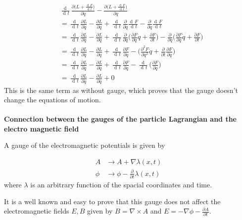 \documentclass{article}
\DeclareMathOperator{\dd}{d\!}
\begin{document}
\begin{align}
    & \frac{\dd}{\dd t} \frac{\partial \big(L + \frac{\dd F}{\dd t}\big)}{\partial \dot{q}} - \frac{\partial \big(L + \frac{\dd F}{\dd t}\big)}{\partial q} \nonumber \\
    & = \frac{\dd}{\dd t} \frac{\partial L}{\partial \dot{q}} - \frac{\partial L }{\partial q}
        + \frac{\dd}{\dd t} \frac{\partial}{\partial \dot{q}} \frac{\dd F}{\dd t}  - \frac{\partial}{\partial q} \frac{\dd F}{\dd t} \nonumber \\
    & = \frac{\dd}{\dd t} \frac{\partial L}{\partial \dot{q}} - \frac{\partial L }{\partial q}
        + \frac{\dd}{\dd t} \frac{\partial}{\partial \dot{q}} \bigg( \frac{\partial F}{\partial q} \dot{q} + \frac{\partial F}{\partial t} \bigg)
        - \frac{\partial}{\partial q} \bigg( \frac{\partial F}{\partial q} \dot{q} + \frac{\partial F}{\partial t} \bigg) \nonumber \\
    & = \frac{\dd}{\dd t} \frac{\partial L}{\partial \dot{q}} - \frac{\partial L }{\partial q}
        + \frac{\dd}{\dd t} \frac{\partial F}{\partial q}
        - \bigg(\frac{\partial^2 F}{\partial q^2} \dot{q} + \frac{\partial }{\partial t} \frac{\partial F}{\partial q} \bigg) \nonumber \\
    & = \frac{\dd}{\dd t} \frac{\partial L}{\partial \dot{q}} - \frac{\partial L }{\partial q}
        + \frac{\dd}{\dd t} \frac{\partial F}{\partial q}
        - \frac{\dd}{\dd t} \bigg(\frac{\partial F}{\partial q} \bigg) \nonumber \\
    & = \frac{\dd}{\dd t} \frac{\partial L}{\partial \dot{q}} - \frac{\partial L }{\partial q} + 0
\end{align}
This is the same term as without gauge, which proves that the gauge doesn't change the equations of motion.
\\
\\
\textbf{Connection between the gauges of the particle Lagrangian and the electro magnetic field}

\noindent A gauge of the electromagnetic potentials is given by

\begin{align}
    A &\rightarrow A + \nabla \lambda(x,t) \\
    \phi &\rightarrow \phi - \frac{\partial}{\partial t} \lambda(x,t)
\end{align}
where $\lambda$ is an arbitrary function of the spacial coordinates and time.

It is a well known and easy to prove that this gauge does not affect the electromagnetic fields $E,B$ given by $B = \nabla \times A$ and $E = - \nabla \phi - \frac{\partial A}{\partial t}$.
\end{document}
